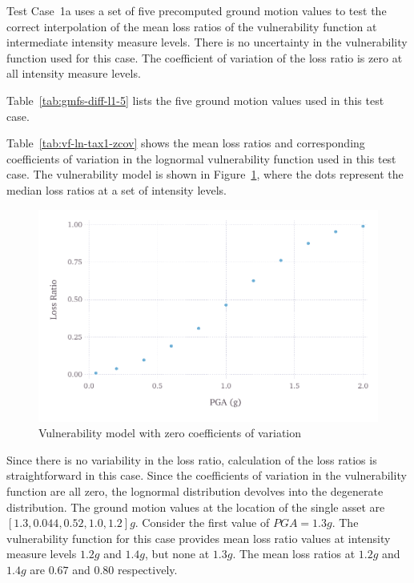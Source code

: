 Test Case~1a uses a set of five precomputed ground motion values to test the correct interpolation of the mean loss ratios of the vulnerability function at intermediate intensity measure levels. There is no uncertainty in the vulnerability function used for this case. The coefficient of variation of the loss ratio is zero at all intensity measure levels.



Table~\ref{tab:gmfs-diff-l1-5} lists the five ground motion values used in this test case.



Table~\ref{tab:vf-ln-tax1-zcov} shows the mean loss ratios and corresponding coefficients of variation in the lognormal vulnerability function used in this test case. The vulnerability model is shown in Figure~\ref{fig:vf-ln-tax1-zcov}, where the dots represent the median loss ratios at a set of intensity levels.

\begin{figure}[htbp]
\centering
\includegraphics[width=12cm]{qareport/figures/fig-vf-ln-tax1-zcov}
\caption{Vulnerability model with zero coefficients of variation}
\label{fig:vf-ln-tax1-zcov}
\end{figure}

Since there is no variability in the loss ratio, calculation of the loss ratios is straightforward in this case. Since the coefficients of variation in the vulnerability function are all zero, the lognormal distribution devolves into the degenerate distribution. The ground motion values at the location of the single asset are $[1.3, 0.044, 0.52, 1.0, 1.2] g$. Consider the first value of $PGA = 1.3 g$. The vulnerability function for this case provides mean loss ratio values at intensity measure levels $1.2 g$ and $1.4 g$, but none at $1.3 g$. The mean loss ratios at $1.2 g$ and $1.4 g$ are $0.67$ and $0.80$ respectively.

